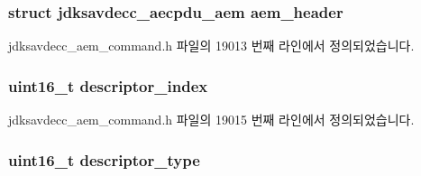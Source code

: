 \subsubsection[{\texorpdfstring{aem\+\_\+header}{aem_header}}]{\setlength{\rightskip}{0pt plus 5cm}struct {\bf jdksavdecc\+\_\+aecpdu\+\_\+aem} aem\+\_\+header}\hypertarget{structjdksavdecc__aem__command__set__signal__selector_ae1e77ccb75ff5021ad923221eab38294}{}\label{structjdksavdecc__aem__command__set__signal__selector_ae1e77ccb75ff5021ad923221eab38294}


jdksavdecc\+\_\+aem\+\_\+command.\+h 파일의 19013 번째 라인에서 정의되었습니다.

\subsubsection[{\texorpdfstring{descriptor\+\_\+index}{descriptor_index}}]{\setlength{\rightskip}{0pt plus 5cm}uint16\+\_\+t descriptor\+\_\+index}\hypertarget{structjdksavdecc__aem__command__set__signal__selector_a042bbc76d835b82d27c1932431ee38d4}{}\label{structjdksavdecc__aem__command__set__signal__selector_a042bbc76d835b82d27c1932431ee38d4}


jdksavdecc\+\_\+aem\+\_\+command.\+h 파일의 19015 번째 라인에서 정의되었습니다.

\subsubsection[{\texorpdfstring{descriptor\+\_\+type}{descriptor_type}}]{\setlength{\rightskip}{0pt plus 5cm}uint16\+\_\+t descriptor\+\_\+type}\hypertarget{structjdksavdecc__aem__command__set__signal__selector_ab7c32b6c7131c13d4ea3b7ee2f09b78d}{}\label{structjdksavdecc__aem__command__set__signal__selector_ab7c32b6c7131c13d4ea3b7ee2f09b78d}


